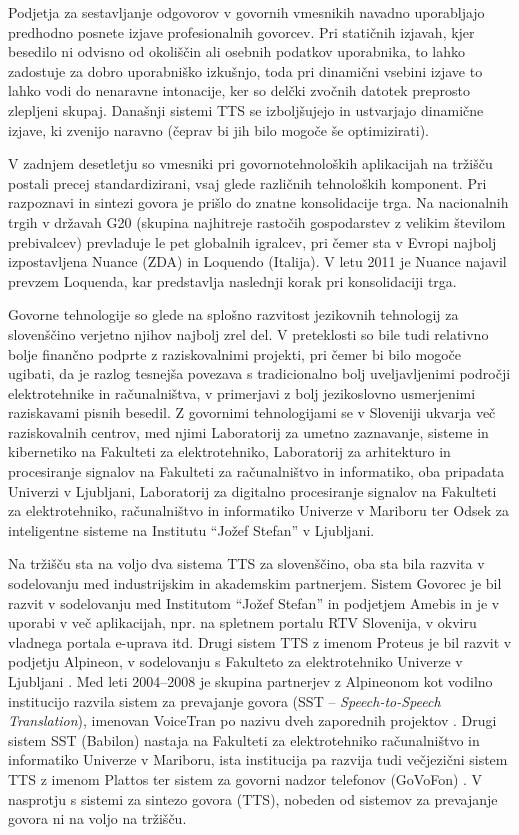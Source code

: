 \begin{multicols}{2}
Podjetja za sestavljanje odgovorov v govornih vmesnikih navadno uporabljajo predhodno posnete izjave profesionalnih govorcev. Pri statičnih izjavah, kjer besedilo ni odvisno od okoliščin ali oseb\-nih podatkov uporabnika, to lahko zadostuje za dobro uporabniško izkušnjo, toda pri dinamični vsebini izjave to lahko vodi do nenaravne intonacije, ker so delčki zvočnih datotek preprosto zlepljeni skupaj. Današnji sistemi TTS se izboljšujejo  in ustvarjajo dinamične izjave, ki zvenijo naravno (čeprav bi jih bilo mogoče še optimizirati).

V zadnjem desetletju so vmesniki pri govor\-notehnoloških aplikacijah na tržišču postali precej standardizirani, vsaj glede različnih tehnoloških komponent. Pri razpoznavi in sintezi govora je prišlo do znatne konsolidacije trga. Na nacionalnih trgih v državah G20 (skupina najhitreje rastočih gospodarstev z velikim številom prebivalcev) prevladuje le pet globalnih igralcev, pri čemer sta v Evropi najbolj izpostavljena Nuance (ZDA) in Loquendo (Italija). V letu 2011 je Nuance najavil prevzem Loquenda, kar predstavlja naslednji korak pri konsolidaciji trga.

Govorne tehnologije so glede na splošno razvitost jezikovnih tehnologij za slovenščino verjetno njihov najbolj zrel del. V preteklosti so bile tudi relativno bolje finančno podprte z raziskovalnimi projekti, pri čemer bi bilo mogoče ugibati, da je razlog tesnej\-ša povezava s tradicionalno bolj uveljavljenimi področji elektrotehnike in računalništva, v primerjavi z bolj jezikoslovno usmerjenimi raziskavami pisnih besedil. Z govornimi tehnologijami se v Sloveniji ukvarja več raziskovalnih centrov, med njimi Labo\-ratorij za umetno zaznavanje, sisteme in kibernetiko na Fakulteti za elektrotehniko, Labo\-ratorij za arhitekturo in procesiranje signalov na Fakulteti za računalništvo in informatiko, oba pripadata Univerzi v Ljubljani, Laboratorij za digitalno procesiranje signalov na Fakulteti za elektrotehniko, računalništvo in informatiko Univerze v Mariboru ter Odsek za inteligentne sisteme na Institutu “Jožef Stefan” v Ljubljani.

Na tržišču sta na voljo dva sistema TTS za slovenščino, oba sta bila razvita v sodelovanju med industrijskim in akademskim partnerjem. Sistem Govorec je bil razvit v sodelovanju med Institutom “Jožef Stefan” in podjetjem Amebis in je v uporabi v več aplikacijah, npr. na spletnem portalu RTV Slovenija, v okviru vladnega portala e-uprava itd. \cite{Amb3}  Drugi sistem TTS z imenom Proteus je bil razvit v podjetju Alpineon, v sodelovanju s Fakulteto za elektrotehniko Univerze v Ljubljani \cite{Alp1}. Med leti 2004--2008 je skupina partnerjev z Alpineonom kot vodilno institucijo razvila sistem za prevajanje govora (SST – \textit{Speech-to-Speech Translation}), imenovan VoiceTran po nazivu dveh zaporednih projektov \cite{Alp2}.  Drugi sistem SST (Babilon) nastaja na Fakulteti za elektrotehniko računalništvo in informatiko Univerze v Mariboru, ista institucija pa razvija tudi večjezični sistem TTS z imenom Plattos ter sistem za govorni nadzor telefonov (GoVoFon) \cite{Lab1}.  V nasprotju s sistemi za sintezo govora (TTS), nobeden od sistemov za prevajanje govora ni na voljo na tržišču.


\end{multicols}
